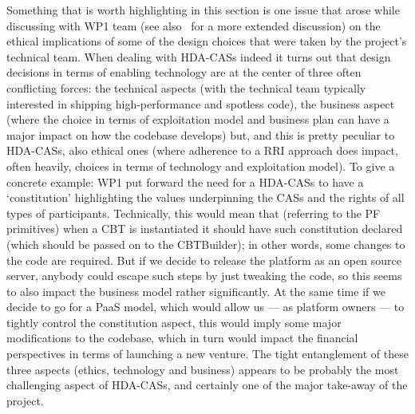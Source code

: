 Something that is worth highlighting in this section is one issue that arose while discussing with WP1 team (see also~\cite{D1.2} for a more extended discussion) on the ethical implications of some of the design choices that were taken by the project's technical team. When dealing with HDA-CASs indeed it turns out that design decisions in terms of enabling technology are at the center of three often conflicting forces: the technical aspects (with the technical team typically interested in shipping high-performance and spotless code), the business aspect (where the choice in terms of exploitation model and business plan can have a major impact on how the codebase develops) but, and this is pretty peculiar to HDA-CASs, also ethical ones (where adherence to a RRI approach does impact, often heavily, choices in terms of technology and exploitation model). To give a concrete example: WP1 put forward the need for a HDA-CASs to have a `constitution' highlighting the values underpinning the CASs and the rights of all types of participants. Technically, this would mean that (referring to the PF primitives) when a CBT is instantiated it should have such constitution declared (which should be passed on to the CBTBuilder); in other words, some changes to the code are required. But if we decide to release the platform as an open source server, anybody could escape such steps by just tweaking the code, so this seems to also impact the business model rather significantly. At the same time if we decide to go for a PaaS model, which would allow us --- as platform owners --- to tightly control the constitution aspect, this would imply some major modifications to the codebase, which in turn would impact the financial perspectives in terms of launching a new venture. The tight entanglement of these three aspects (ethics, technology and business) appears to be probably the most challenging aspect of HDA-CASs, and certainly one of the major take-away of the project. 

